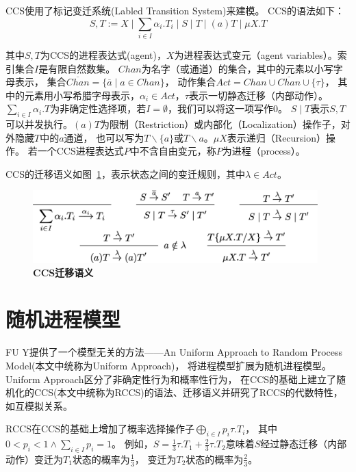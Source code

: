    CCS使用了标记变迁系统(Labled Transition System)来建模。
   CCS的语法如下：
   \begin{equation}
    S,T:=X\mid \sum_{i\in I}\alpha_i.T_i\mid S\mid T \mid (a)T \mid \mu X.T
   \end{equation}

   其中$S,T$为CCS的进程表达式(agent)，$X$为进程表达式变元（agent variables）。索引集合$I$是有限自然数集。
   $Chan$为名字（或通道）的集合，其中的元素以小写字母表示，
   集合$\overline{Chan}=\{\overline{a}\mid a\in Chan\}$，
   动作集合$Act=Chan\cup \overline{Chan}\cup \{\tau\} $，
   其中的元素用小写希腊字母表示，$\alpha_i\in Act$，$\tau$表示一切静态迁移（内部动作）。
   $\sum_{i\in I}\alpha_i.T$为非确定性选择项，若$I=\emptyset$，我们可以将这一项写作$0$。
   $S\mid T$表示$S,T$可以并发执行。$(a)T$为限制（Restriction）或内部化（Localization）操作子，对外隐藏$T$中的$a$通道，
   也可以写为$T\backslash \{a\}$或$T\backslash a$。$\mu X$表示递归（Recursion）操作。
   若一个CCS进程表达式$P$中不含自由变元，称$P$为进程（process）。

   CCS的迁移语义如图~\ref{fig_ccs}，表示状态之间的变迁规则，其中$\lambda \in Act$。

   \begin{figure}[!htbp]
    \small
    \centering
    \includegraphics[width=11cm]{../figures/ccs.png}
    \caption[]{\textbf{CCS迁移语义}}
     \label{fig_ccs}
 \end{figure}

   \section{随机进程模型}

   FU Y提供了一个模型无关的方法——An Uniform Approach to Random Process Model(本文中统称为Uniform Approach)\cite{Fu_UniformApproach}，
   将进程模型扩展为随机进程模型。
   Uniform Approach区分了非确定性行为和概率性行为，
   在CCS的基础上建立了随机化的CCS(本文中统称为RCCS)的语法、迁移语义并研究了RCCS的代数特性，如互模拟关系。

   RCCS在CCS的基础上增加了概率选择操作子$\bigoplus_{i\in I}p_i\tau.T_i$，
   其中$0<p_i<1 \wedge \sum_{i\in I}p_i = 1$。
   例如，$S=\frac{1}{3}\tau.T_1+\frac{2}{3}\tau.T_2$意味着$S$经过静态迁移（内部动作）变迁为$T_1$状态的概率为$\frac{1}{3}$，
   变迁为$T_2$状态的概率为$\frac{2}{3}$。


